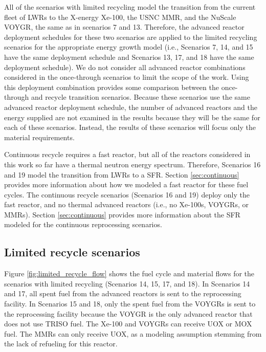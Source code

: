 All of the scenarios with limited recycling model the transition from the 
current fleet of \glspl{LWR} to the X-energy Xe-100, the \gls{USNC} \gls{MMR}, 
and the NuScale VOYGR, the same as in scenarios 7 and 13. Therefore, 
the advanced reactor deployment schedules for these two scenarios are applied 
to the limited recycling scenarios for the appropriate energy growth model
(i.e., Scenarios 7, 14, and 15 have the same deployment schedule and 
Scenarios 13, 17, and 18 have the same deployment schedule). 
We do not consider all advanced reactor 
combinations considered in the once-through scenarios to limit the scope 
of the work. Using this deployment combination provides some comparison between the 
once-through and recycle transition scenarios. Because these scenarios 
use the same advanced reactor deployment schedule, the number of 
advanced reactors and the energy supplied are not examined in the 
results because they will be the same for each of these scenarios. Instead, 
the results of these scenarios will focus only the material requirements. 

Continuous recycle 
requires a fast reactor, but all of the reactors considered in this 
work so far have a thermal neutron energy spectrum. Therefore, 
Scenarios 16 and 19 model the transition from \glspl{LWR} 
to a \gls{SFR}. Section 
\ref{sec:continuous} provides more information about how we 
modeled a fast reactor for these fuel cycles. The continuous recycle 
scenarios (Scenarios 16 and 19) deploy only the fast reactor, and no 
thermal advanced reactors (i.e., no Xe-100s, VOYGRs, or \glspl{MMR}).
Section \ref{sec:continuous} provides more information about the 
\gls{SFR} modeled for the continuous reprocessing scenarios. 

\subsection{Limited recycle scenarios}
Figure \ref{fig:limited_recycle_flow} shows the fuel cycle and material flows 
for the scenarios with limited recycling (Scenarios 14, 15, 17, and 18). 
In Scenarios 14 and 17, all spent fuel from the advanced reactors is sent 
to the reprocessing facility.
In Scenarios 15 and 18, only the spent fuel from the 
VOYGRs is sent to the reprocessing facility because the VOYGR is 
the only advanced reactor that does not use \gls{TRISO} fuel.
The Xe-100 and VOYGRs can receive 
\gls{UOX} or \gls{MOX} fuel. The \glspl{MMR} can only receive 
\gls{UOX}, as a modeling assumption stemming from the lack of 
refueling for this reactor.

